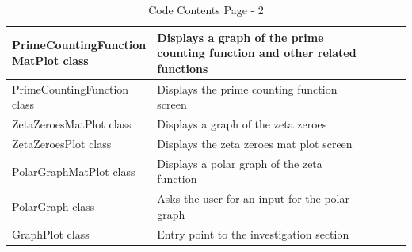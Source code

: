 \documentclass{article}
\begin{document}
\begin{table}[ht]
\begin{tabular}{ | p{0.33\linewidth} | p{0.57\linewidth} | p{0.1\linewidth} |}
    \hline
    PrimeCountingFunction MatPlot class & Displays a graph of the prime counting function and other related functions & \\
    \hline
    PrimeCountingFunction class & Displays the prime counting function screen & \\
    \hline
    ZetaZeroesMatPlot class & Displays a graph of the zeta zeroes & \\
    \hline
    ZetaZeroesPlot class & Displays the zeta zeroes mat plot screen & \\
    \hline
    PolarGraphMatPlot class & Displays a polar graph of the zeta function & \\
    \hline
    PolarGraph class & Asks the user for an input for the polar graph& \\
    \hline
    GraphPlot class & Entry point to the investigation section & \\
    \hline
    \end{tabular}
    \caption{Code Contents Page - 2}
\end{table}
\clearpage
\end{document}
